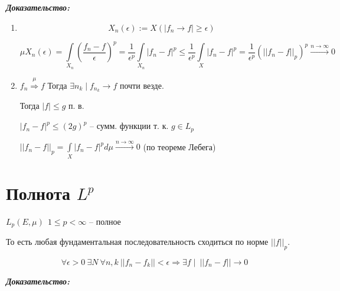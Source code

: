 \documentclass[paper=a4, fontsize=13.2pt]{article}
\begin{document}
\textbf{\emph{Доказательство:}}

\begin{enumerate}
	\item $$ X_n(\epsilon) := X(|f_n \rightarrow f| \geq \epsilon) $$
	
	$$ \mu X_n(\epsilon) = \int\limits_{X_n} (\frac{f_n - f}{\epsilon})^p  = 
	\frac{1}{\epsilon^p} \int\limits_{X_n} |f_n - f|^p \leq 
	\frac{1}{\epsilon^p} \int\limits_{X} |f_n - f|^p = 
	\frac{1}{\epsilon^p} (||f_n - f||_p)^p \stackrel{n \rightarrow \infty}{\rightarrow} 0$$
	
	\item $ f_n \stackrel{\mu}{\Rightarrow} f $ Тогда $ \exists n_k \mid f_{n_k} \rightarrow f $ почти везде. 
	
	Тогда $ |f| \leq g $ п. в. 
	
	$ |f_n - f|^p \leq (2g)^p $ -- сумм. функции т. к. $ g \in L_p $
	
	$ ||f_n - f||_p = \int\limits_{X} |f_n - f|^p d\mu \stackrel{n \rightarrow \infty}{\rightarrow} 0 $ (по теореме Лебега)
	
\end{enumerate}

\section{Полнота $L^p$}
$ L_p(E, \mu) ~ ~ 1 \leq p < \infty $ -- полное 

То есть любая фундаментальная последовательность сходиться по норме $ ||f||_p $.

$$ \forall \epsilon > 0 ~ \exists N ~ \forall n, k ~ ||f_n - f_k|| < \epsilon \Rightarrow \exists f \mid ~ ||f_n - f|| \rightarrow 0 $$


\textbf{\emph{Доказательство:}}
\end{document}
